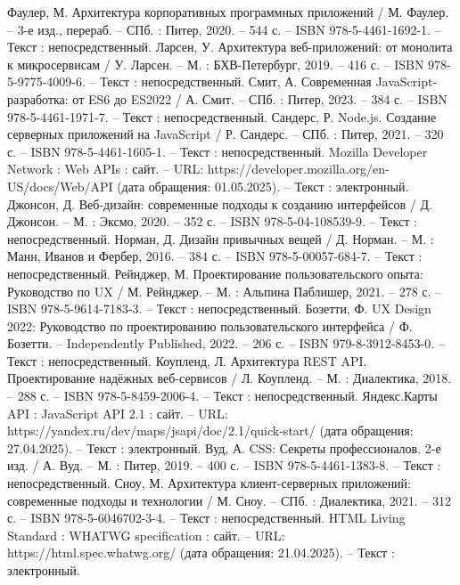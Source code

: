 
\begin{thebibliography}{21}

     Фаулер, М. Архитектура корпоративных программных приложений / М. Фаулер. – 3-е изд., перераб. – СПб. : Питер, 2020. – 544 с. – ISBN 978-5-4461-1692-1. – Текст : непосредственный.
   		Ларсен, У. Архитектура веб-приложений: от монолита к микросервисам / У. Ларсен. – М. : БХВ-Петербург, 2019. – 416 с. – ISBN 978-5-9775-4009-6. – Текст : непосредственный.
   		Смит, А. Современная JavaScript-разработка: от ES6 до ES2022 / А. Смит. – СПб. : Питер, 2023. – 384 с. – ISBN 978-5-4461-1971-7. – Текст : непосредственный.
    	Сандерс, Р. Node.js. Создание серверных приложений на JavaScript / Р. Сандерс. – СПб. : Питер, 2021. – 320 с. – ISBN 978-5-4461-1605-1. – Текст : непосредственный.
   		Mozilla Developer Network : Web APIs : сайт. – URL: https://developer.mozilla.org/en-US/docs/Web/API (дата обращения: 01.05.2025). – Текст : электронный.
		Джонсон, Д. Веб-дизайн: современные подходы к созданию интерфейсов / Д. Джонсон. – М. : Эксмо, 2020. – 352 с. – ISBN 978-5-04-108539-9. – Текст : непосредственный.
	 Норман, Д. Дизайн привычных вещей / Д. Норман. – М. : Манн, Иванов и Фербер, 2016. – 384 с. – ISBN 978-5-00057-684-7. – Текст : непосредственный.
   		Рейнджер, М. Проектирование пользовательского опыта: Руководство по UX / М. Рейнджер. – М. : Альпина Паблишер, 2021. – 278 с. – ISBN 978-5-9614-7183-3. – Текст : непосредственный.    
	 Бозетти, Ф. UX Design 2022: Руководство по проектированию пользовательского интерфейса / Ф. Бозетти. – Independently Published, 2022. – 206 с. – ISBN 979-8-3912-8453-0. – Текст : непосредственный.
		Коупленд, Л. Архитектура REST API. Проектирование надёжных веб-сервисов / Л. Коупленд. – М. : Диалектика, 2018. – 288 с. – ISBN 978-5-8459-2006-4. – Текст : непосредственный.
 	 Яндекс.Карты API : JavaScript API 2.1 : сайт. – URL: https://yandex.ru/dev/maps/jsapi/doc/2.1/quick-start/ (дата обращения: 27.04.2025). – Текст : электронный.
 		Вуд, А. CSS: Секреты профессионалов. 2-е изд. / А. Вуд. – М. : Питер, 2019. – 400 с. – ISBN 978-5-4461-1383-8. – Текст : непосредственный.
 	 Сноу, М. Архитектура клиент-серверных приложений: современные подходы и технологии / М. Сноу. – СПб. : Диалектика, 2021. – 312 с. – ISBN 978-5-6046702-3-4. – Текст : непосредственный.	
 	 HTML Living Standard : WHATWG specification : сайт. – URL: https://html.spec.whatwg.org/ (дата обращения: 21.04.2025). – Текст : электронный.

\end{thebibliography}
